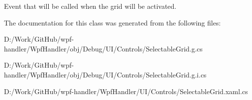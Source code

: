 Event that will be called when the grid will be activated. 



The documentation for this class was generated from the following files\+:\begin{DoxyCompactItemize}
\item 
D\+:/\+Work/\+Git\+Hub/wpf-\/handler/\+Wpf\+Handler/obj/\+Debug/\+U\+I/\+Controls/Selectable\+Grid.\+g.\+cs\item 
D\+:/\+Work/\+Git\+Hub/wpf-\/handler/\+Wpf\+Handler/obj/\+Debug/\+U\+I/\+Controls/Selectable\+Grid.\+g.\+i.\+cs\item 
D\+:/\+Work/\+Git\+Hub/wpf-\/handler/\+Wpf\+Handler/\+U\+I/\+Controls/Selectable\+Grid.\+xaml.\+cs\end{DoxyCompactItemize}
